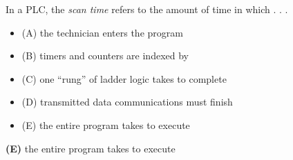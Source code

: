 

In a PLC, the {\it scan time} refers to the amount of time in which . . .

\begin{itemize}
\item{(A)} the technician enters the program
\vskip 5pt 
\item{(B)} timers and counters are indexed by
\vskip 5pt 
\item{(C)} one ``rung'' of ladder logic takes to complete
\vskip 5pt 
\item{(D)} transmitted data communications must finish
\vskip 5pt 
\item{(E)} the entire program takes to execute
\end{itemize}







{\bf (E)} the entire program takes to execute
 










